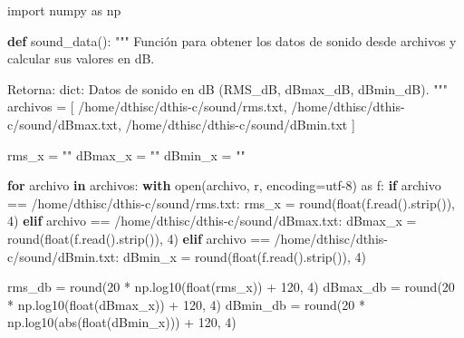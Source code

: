 \documentclass[
  letterpaper,
]{scrbook}
\newenvironment{Shaded}{\begin{snugshade}}{\end{snugshade}}
\newcommand{\BuiltInTok}[1]{\textcolor[rgb]{0.00,0.23,0.31}{#1}}
\newcommand{\CommentTok}[1]{\textcolor[rgb]{0.37,0.37,0.37}{#1}}
\newcommand{\ControlFlowTok}[1]{\textcolor[rgb]{0.00,0.23,0.31}{\textbf{#1}}}
\newcommand{\DecValTok}[1]{\textcolor[rgb]{0.68,0.00,0.00}{#1}}
\newcommand{\ImportTok}[1]{\textcolor[rgb]{0.00,0.46,0.62}{#1}}
\newcommand{\KeywordTok}[1]{\textcolor[rgb]{0.00,0.23,0.31}{\textbf{#1}}}
\newcommand{\NormalTok}[1]{\textcolor[rgb]{0.00,0.23,0.31}{#1}}
\newcommand{\OperatorTok}[1]{\textcolor[rgb]{0.37,0.37,0.37}{#1}}
\newcommand{\StringTok}[1]{\textcolor[rgb]{0.13,0.47,0.30}{#1}}
\begin{document}
\begin{Shaded}
\begin{Highlighting}[]
\ImportTok{import}\NormalTok{ numpy }\ImportTok{as}\NormalTok{ np}

\KeywordTok{def}\NormalTok{ sound\_data():}
    \CommentTok{"""}
\CommentTok{    Función para obtener los datos de sonido desde archivos y calcular sus valores en dB.}

\CommentTok{    Retorna:}
\CommentTok{        dict: Datos de sonido en dB (RMS\_dB, dBmax\_dB, dBmin\_dB).}
\CommentTok{    """}
\NormalTok{    archivos }\OperatorTok{=}\NormalTok{ [}
        \StringTok{\textquotesingle{}/home/dthisc/dthis{-}c/sound/rms.txt\textquotesingle{}}\NormalTok{,}
        \StringTok{\textquotesingle{}/home/dthisc/dthis{-}c/sound/dBmax.txt\textquotesingle{}}\NormalTok{,}
        \StringTok{\textquotesingle{}/home/dthisc/dthis{-}c/sound/dBmin.txt\textquotesingle{}}
\NormalTok{    ]}
    
\NormalTok{    rms\_x }\OperatorTok{=} \StringTok{""}
\NormalTok{    dBmax\_x }\OperatorTok{=} \StringTok{""}
\NormalTok{    dBmin\_x }\OperatorTok{=} \StringTok{""}

    \ControlFlowTok{for}\NormalTok{ archivo }\KeywordTok{in}\NormalTok{ archivos:}
        \ControlFlowTok{with} \BuiltInTok{open}\NormalTok{(archivo, }\StringTok{\textquotesingle{}r\textquotesingle{}}\NormalTok{, encoding}\OperatorTok{=}\StringTok{\textquotesingle{}utf{-}8\textquotesingle{}}\NormalTok{) }\ImportTok{as}\NormalTok{ f:}
            \ControlFlowTok{if}\NormalTok{ archivo }\OperatorTok{==} \StringTok{\textquotesingle{}/home/dthisc/dthis{-}c/sound/rms.txt\textquotesingle{}}\NormalTok{:}
\NormalTok{                rms\_x }\OperatorTok{=} \BuiltInTok{round}\NormalTok{(}\BuiltInTok{float}\NormalTok{(f.read().strip()), }\DecValTok{4}\NormalTok{)}
            \ControlFlowTok{elif}\NormalTok{ archivo }\OperatorTok{==} \StringTok{\textquotesingle{}/home/dthisc/dthis{-}c/sound/dBmax.txt\textquotesingle{}}\NormalTok{:}
\NormalTok{                dBmax\_x }\OperatorTok{=} \BuiltInTok{round}\NormalTok{(}\BuiltInTok{float}\NormalTok{(f.read().strip()), }\DecValTok{4}\NormalTok{)}
            \ControlFlowTok{elif}\NormalTok{ archivo }\OperatorTok{==} \StringTok{\textquotesingle{}/home/dthisc/dthis{-}c/sound/dBmin.txt\textquotesingle{}}\NormalTok{:}
\NormalTok{                dBmin\_x }\OperatorTok{=} \BuiltInTok{round}\NormalTok{(}\BuiltInTok{float}\NormalTok{(f.read().strip()), }\DecValTok{4}\NormalTok{)}

\NormalTok{    rms\_db }\OperatorTok{=} \BuiltInTok{round}\NormalTok{(}\DecValTok{20} \OperatorTok{*}\NormalTok{ np.log10(}\BuiltInTok{float}\NormalTok{(rms\_x)) }\OperatorTok{+} \DecValTok{120}\NormalTok{, }\DecValTok{4}\NormalTok{)}
\NormalTok{    dBmax\_db }\OperatorTok{=} \BuiltInTok{round}\NormalTok{(}\DecValTok{20} \OperatorTok{*}\NormalTok{ np.log10(}\BuiltInTok{float}\NormalTok{(dBmax\_x)) }\OperatorTok{+} \DecValTok{120}\NormalTok{, }\DecValTok{4}\NormalTok{)}
\NormalTok{    dBmin\_db }\OperatorTok{=} \BuiltInTok{round}\NormalTok{(}\DecValTok{20} \OperatorTok{*}\NormalTok{ np.log10(}\BuiltInTok{abs}\NormalTok{(}\BuiltInTok{float}\NormalTok{(dBmin\_x))) }\OperatorTok{+} \DecValTok{120}\NormalTok{, }\DecValTok{4}\NormalTok{)}


\end{Highlighting}
\end{Shaded}
\end{document}

